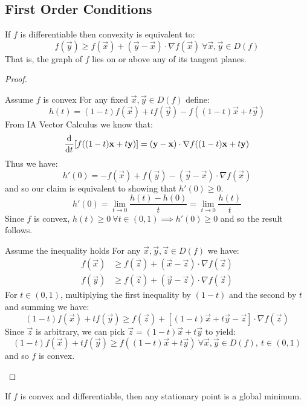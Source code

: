 \documentclass[../main.tex]{subfiles}
\begin{document}
\subsection{First Order Conditions}
\begin{theorem}
  If $f$ is differentiable then convexity is equivalent to:
  \[
    f(\vec{y}) \geq f(\vec{x}) + (\vec{y} - \vec{x}) \cdot \nabla f(\vec{x})\ \forall \vec{x}, \vec{y} \in D(f)
  \]
  That is, the graph of $f$ lies on or above any of its tangent planes.
\end{theorem}
\begin{proof}
  \begin{proofdirection}{Assume $f$ is convex}
    For any fixed $\vec{x}, \vec{y} \in D(f)$ define:
    \[
      h(t) = (1 - t)f(\vec{x}) + tf(\vec{y}) - f((1 - t)\vec{x} + t\vec{y})
    \]
    From IA Vector Calculus we know that:
    \[
      \deriv{}{t}[f((1 - t)\vec{x} + t\vec{y})] = (\vec{y} - \vec{x}) \cdot \nabla f((1 - t)\vec{x} + t \vec{y})
    \]
    Thus we have:
    \[
      h'(0) = - f(\vec{x}) + f(\vec{y}) - (\vec{y} - \vec{x}) \cdot \nabla f(\vec{x})
    \]
    and so our claim is equivalent to showing that $h'(0) \geq 0$.
    \[
      h'(0) = \lim_{t \to 0} \frac{h(t) - h(0)}{t} = \lim_{t \to 0} \frac{h(t)}{t}
    \]
    Since $f$ is convex, $h(t) \geq 0\ \forall t \in (0, 1) \implies h'(0) \geq 0$ and so the result follows.
  \end{proofdirection}
  \begin{proofdirection}{Assume the inequality holds}
    For any $\vec{x}, \vec{y}, \vec{z} \in D(f)$ we have:
    \begin{align*}
      f(\vec{x}) &\geq f(\vec{z}) + (\vec{x} - \vec{z}) \cdot \nabla f(\vec{z}) \\
      f(\vec{y}) &\geq f(\vec{z}) + (\vec{y} - \vec{z}) \cdot \nabla f(\vec{z})
    \end{align*}
    For $t \in (0, 1)$, multiplying the first inequality by $(1 - t)$ and the second by $t$ and summing we have:
    \[
      (1 - t)f(\vec{x}) + tf(\vec{y}) \geq f(\vec{z}) + [(1 - t)\vec{x} + t\vec{y} -  \vec{z}] \cdot \nabla f(\vec{z})
    \]
    Since $\vec{z}$ is arbitrary, we can pick $\vec{z} = (1 - t)\vec{x} + t\vec{y}$ to yield:
    \[
      (1 - t)f(\vec{x}) + tf(\vec{y}) \geq f((1 - t)\vec{x} + t\vec{y})\ \forall \vec{x}, \vec{y} \in D(f), \ t \in (0, 1)
    \]
    and so $f$ is convex.
  \end{proofdirection}
\end{proof}
\begin{corollary}
  If $f$ is convex and differentiable, then any stationary point is a global minimum. \label{globalMin}
\end{corollary}
\end{document}
